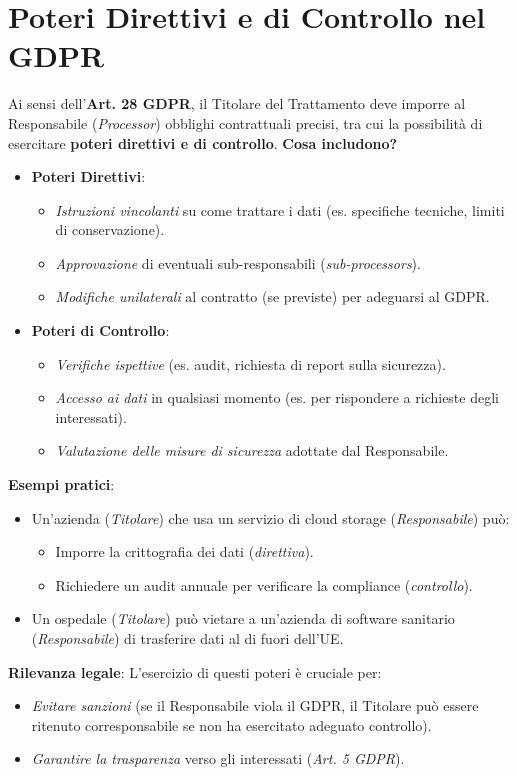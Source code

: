 \documentclass[8pt,oneside,a4paper]{article}
\begin{document}
	\section{Poteri Direttivi e di Controllo nel GDPR}
	Ai sensi dell’\textbf{Art. 28 GDPR}, il Titolare del Trattamento deve imporre al Responsabile (\textit{Processor}) obblighi contrattuali precisi, tra cui la possibilità di esercitare \textbf{poteri direttivi e di controllo}.  
	\noindent \textbf{Cosa includono?}  
	\begin{itemize}
		\item \textbf{Poteri Direttivi}:  
		\begin{itemize}
			\item \textit{Istruzioni vincolanti} su come trattare i dati (es. specifiche tecniche, limiti di conservazione).  
			\item \textit{Approvazione} di eventuali sub-responsabili (\textit{sub-processors}).  
			\item \textit{Modifiche unilaterali} al contratto (se previste) per adeguarsi al GDPR.  
		\end{itemize}  
		\item \textbf{Poteri di Controllo}:  
		\begin{itemize}
			\item \textit{Verifiche ispettive} (es. audit, richiesta di report sulla sicurezza).  
			\item \textit{Accesso ai dati} in qualsiasi momento (es. per rispondere a richieste degli interessati).  
			\item \textit{Valutazione delle misure di sicurezza} adottate dal Responsabile.  
		\end{itemize}  
	\end{itemize}  
	\noindent \textbf{Esempi pratici}:  
	\begin{itemize}
		\item Un’azienda (\textit{Titolare}) che usa un servizio di cloud storage (\textit{Responsabile}) può:  
		\begin{itemize}
			\item Imporre la crittografia dei dati (\textit{direttiva}).  
			\item Richiedere un audit annuale per verificare la compliance (\textit{controllo}).  
		\end{itemize}  
		\item Un ospedale (\textit{Titolare}) può vietare a un’azienda di software sanitario (\textit{Responsabile}) di trasferire dati al di fuori dell’UE.  
	\end{itemize}  
	\noindent \textbf{Rilevanza legale}:  
	L’esercizio di questi poteri è cruciale per:  
	\begin{itemize}
		\item \textit{Evitare sanzioni} (se il Responsabile viola il GDPR, il Titolare può essere ritenuto corresponsabile se non ha esercitato adeguato controllo).  
		\item \textit{Garantire la trasparenza} verso gli interessati (\textit{Art. 5 GDPR}).  
	\end{itemize}  
\end{document}
